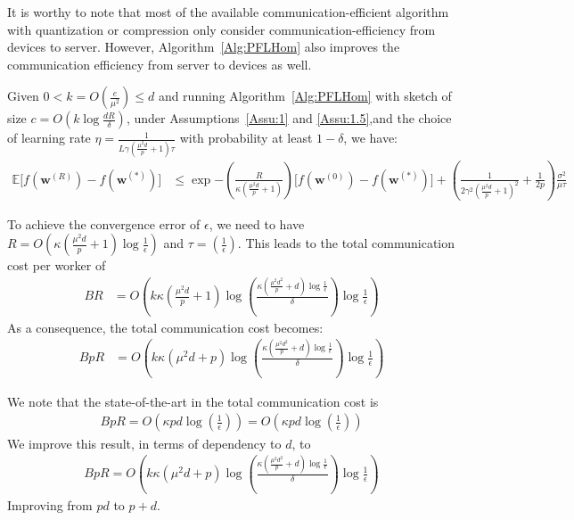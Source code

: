 \begin{remark}
It is worthy to note that most of the available communication-efficient algorithm with quantization or compression only consider communication-efficiency from devices to server. However, Algorithm~\ref{Alg:PFLHom} also improves the communication efficiency from server to devices as well. 
\end{remark}
\begin{theorem}
Given $0<k=O\left(\frac{e}{\mu^2}\right)\leq d$
and running Algorithm~\ref{Alg:PFLHom} with sketch of size $c=O\left(k\log \frac{d R}{\delta}\right)$,  under Assumptions~\ref{Assu:1} and \ref{Assu:1.5},and the choice of learning rate $\eta=\frac{1}{L\gamma (\frac{\mu^2d}{p}+1) \tau}$ with probability at least $1-\delta$, we have:
\begin{align}
                \mathbb{E}\Big[f({\boldsymbol{w}}^{(R)})-f({\boldsymbol{w}}^{(*)})\Big]&\leq \exp{-\left(\frac{ R}{\kappa (\frac{\mu^2d}{p}+1)}\right)}\Big[f({\boldsymbol{w}}^{(0)})-f({\boldsymbol{w}}^{(*)})\Big]+\left(\frac{1}{2\gamma^2 {(\frac{\mu^2d}{p}+1)}^2 }+\frac{1}{2p}\right)\frac{\sigma^2}{\mu\tau}
\end{align}
\end{theorem}

\begin{remark}
To achieve the convergence error of $\epsilon$, we need to have $R=O\left(\kappa(\frac{\mu^2d}{p}+1)\log\frac{1}{\epsilon}\right)$ and $\tau=\left(\frac{1}{\epsilon}\right)$. This leads to the total communication cost per worker of 
\begin{align}
BR&=O\left(k\kappa(\frac{\mu^2d}{p}+1)\log\left(\frac{\kappa(\frac{\mu^2d^2}{p}+d)\log\frac{1}{\epsilon}}{\delta}\right)\log\frac{1}{\epsilon} \right)
\end{align}
As a consequence, the total communication cost becomes:
\begin{align}
BpR&=O\left(k\kappa(\mu^2d+p)\log\left(\frac{\kappa(\frac{\mu^2d^2}{p}+d)\log\frac{1}{\epsilon}}{\delta}\right)\log\frac{1}{\epsilon} \right)
\end{align}
\end{remark}

\begin{remark}
We note that the state-of-the-art in \cite{karimireddy2019scaffold} the total communication cost is 
\begin{align}
    BpR=O\left(\kappa pd\log\left(\frac{1}{\epsilon}\right) \right)=O\left(\kappa pd\log\left(\frac{1}{\epsilon}\right)\right) 
\end{align}
We improve this result, in terms of dependency to $d$, to 
\begin{align}
    BpR=O\left(k\kappa(\mu^2d+p)\log\left(\frac{\kappa(\frac{\mu^2d^2}{p}+d)\log\frac{1}{\epsilon}}{\delta}\right)\log\frac{1}{\epsilon} \right)
\end{align}
Improving from $pd$ to $p+d$.
\end{remark}

